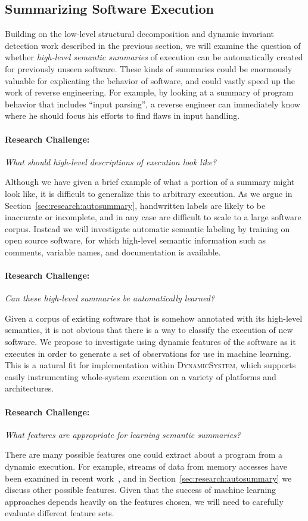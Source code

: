 \documentclass[letterpaper,twoside,11pt,headings=small]{scrartcl}
\newcommand{\dynamicsys}{\textsc{DynamicSystem}\xspace}
\newcommand{\challenge}[1]{\paragraph{Research Challenge:} \emph{#1}}
\begin{document}
\subsection{Summarizing Software Execution}
\label{sec:overview:autosummary}

Building on the low-level structural decomposition and dynamic invariant
detection work described in the previous section, we will examine the question
of whether \emph{high-level semantic summaries} of execution can be
automatically created for previously unseen software. These kinds of summaries
could be enormously valuable for explicating the behavior of software, and
could vastly speed up the work of reverse engineering. For example, by looking
at a summary of program behavior that includes ``input parsing'', a reverse
engineer can immediately know where he should focus his efforts to find flaws
in input handling.

\challenge{What should high-level descriptions of execution look like?}

Although we have given a brief example of what a portion of a summary might
look like, it is difficult to generalize this to arbitrary execution. As we
argue in Section~\ref{sec:research:autosummary}, handwritten labels are likely
to be inaccurate or incomplete, and in any case are difficult to scale to
a large software corpus. Instead we will investigate automatic semantic
labeling by training on open source software, for which high-level semantic
information such as comments, variable names, and documentation is available.

\challenge{Can these high-level summaries be automatically learned?}

Given a corpus of existing software that is somehow annotated with its
high-level semantics, it is not obvious that there is a way to classify the
execution of new software. We propose to investigate using dynamic features of
the software as it executes in order to generate a set of observations for use
in machine learning. This is a natural fit for implementation within
\dynamicsys, which supports easily instrumenting whole-system execution on a
variety of platforms and architectures.

\challenge{What features are appropriate for learning semantic summaries?}

There are many possible features one could extract about a program from a
dynamic execution. For example, streams of data from memory accesses have
been examined in recent work~\cite{dolangavitt:2013:tzb}, and in
Section~\ref{sec:research:autosummary} we discuss other possible features.
Given that the success of machine learning approaches depends heavily on the
features chosen, we will need to carefully evaluate different feature sets.
\end{document}
